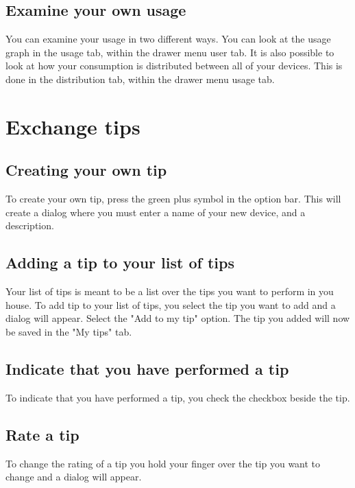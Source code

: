\subsection{Examine your own usage}
You can examine your usage in two different ways. You can look at the usage graph in the usage tab, within the drawer menu user tab. It is also possible to look at how your consumption is distributed between all of your devices. This is done in the distribution tab, within the drawer menu usage tab. 


\section{Exchange tips}

\subsection{Creating your own tip}
To create your own tip, press the green plus symbol in the option bar. This will create a dialog where you must enter a name of your new device, and a description. 
\subsection{Adding a tip to your list of tips}
Your list of tips is meant to be a list over the tips you want to perform in you house. To add tip to your list of tips, you select the tip you want to add and a dialog will appear. Select the "Add to my tip" option. The tip you added will now be saved in the "My tips" tab. 
\subsection{Indicate that you have performed a tip}
To indicate that you have performed a tip, you check the checkbox beside the tip.
\subsection{Rate a tip}
To change the rating of a tip you hold your finger over the tip you want to change and a dialog will appear. 

